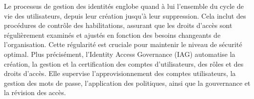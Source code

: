 Le processus de gestion des identités englobe quand à lui l'ensemble du cycle de vie des utilisateurs, depuis leur création jusqu'à leur suppression. 
Cela inclut des procédures de contrôle des habilitations, assurant que les droits d'accès sont régulièrement examinés et ajustés en fonction des besoins changeants de l'organisation.
Cette régularité est cruciale pour maintenir le niveau de sécurité optimal.
Plus précisément, l'Identity Access Governance (IAG) automatise la création, la gestion et la certification des comptes d'utilisateurs, des rôles et des droits d'accès. 
Elle supervise l'approvisionnement des comptes utilisateurs, la gestion des mots de passe, l'application des politiques, ainsi que la gouvernance et la révision des accès.




